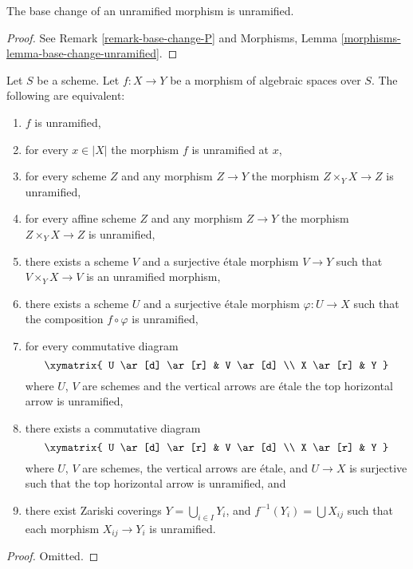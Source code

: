 \begin{lemma}
\label{lemma-base-change-unramified}
The base change of an unramified morphism is unramified.
\end{lemma}

\begin{proof}
See Remark \ref{remark-base-change-P} and
Morphisms, Lemma \ref{morphisms-lemma-base-change-unramified}.
\end{proof}

\begin{lemma}
\label{lemma-unramified-local}
Let $S$ be a scheme.
Let $f : X \to Y$ be a morphism of algebraic spaces over $S$.
The following are equivalent:
\begin{enumerate}
\item $f$ is unramified,
\item for every $x \in |X|$ the morphism $f$ is unramified at $x$,
\item for every scheme $Z$ and any morphism $Z \to Y$ the morphism
$Z \times_Y X \to Z$ is unramified,
\item for every affine scheme $Z$ and any morphism
$Z \to Y$ the morphism $Z \times_Y X \to Z$ is unramified,
\item there exists a scheme $V$ and a surjective \'etale morphism
$V \to Y$ such that $V \times_Y X \to V$ is an unramified morphism,
\item there exists a scheme $U$ and a surjective \'etale morphism
$\varphi : U \to X$ such that the composition $f \circ \varphi$
is unramified,
\item for every commutative diagram
$$
\xymatrix{
U \ar[d] \ar[r] & V \ar[d] \\
X \ar[r] & Y
}
$$
where $U$, $V$ are schemes and the vertical arrows are \'etale
the top horizontal arrow is unramified,
\item there exists a commutative diagram
$$
\xymatrix{
U \ar[d] \ar[r] & V \ar[d] \\
X \ar[r] & Y
}
$$
where $U$, $V$ are schemes, the vertical arrows are \'etale, and
$U \to X$ is surjective such that the top horizontal arrow is unramified, and
\item there exist Zariski coverings $Y = \bigcup_{i \in I} Y_i$,
and $f^{-1}(Y_i) = \bigcup X_{ij}$ such that
each morphism $X_{ij} \to Y_i$ is unramified.
\end{enumerate}
\end{lemma}

\begin{proof}
Omitted.
\end{proof}


